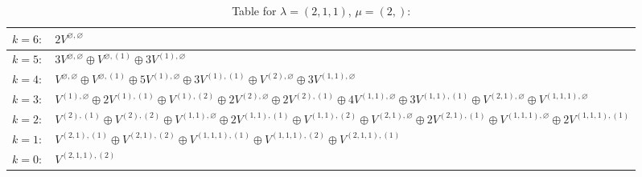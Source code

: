 \documentclass[a4paper,12pt]{article}
\begin{document}
\renewcommand{\arraystretch}{1.6} 
\begin{table}[H]
\centering
\caption{Table for $\lambda = (2, 1, 1)$, $\mu = (2,)$:}
\begin{tabular}{|>{\centering\arraybackslash}p{15cm}|}
\hline
 $k = 6: \quad 2 V^{\varnothing, \varnothing} $ \\ \hline
 $k = 5: \quad 3 V^{\varnothing, \varnothing} \oplus V^{\varnothing, (1)} \oplus 3 V^{(1), \varnothing} $ \\ \hline
 $k = 4: \quad V^{\varnothing, \varnothing} \oplus V^{\varnothing, (1)} \oplus 5 V^{(1), \varnothing} \oplus 3 V^{(1), (1)} \oplus V^{(2), \varnothing} \oplus 3 V^{(1, 1), \varnothing} $ \\ \hline
 $k = 3: \quad V^{(1), \varnothing} \oplus 2 V^{(1), (1)} \oplus V^{(1), (2)} \oplus 2 V^{(2), \varnothing} \oplus 2 V^{(2), (1)} \oplus 4 V^{(1, 1), \varnothing} \oplus 3 V^{(1, 1), (1)} \oplus V^{(2, 1), \varnothing} \oplus V^{(1, 1, 1), \varnothing} $ \\ \hline
 $k = 2: \quad V^{(2), (1)} \oplus V^{(2), (2)} \oplus V^{(1, 1), \varnothing} \oplus 2 V^{(1, 1), (1)} \oplus V^{(1, 1), (2)} \oplus V^{(2, 1), \varnothing} \oplus 2 V^{(2, 1), (1)} \oplus V^{(1, 1, 1), \varnothing} \oplus 2 V^{(1, 1, 1), (1)} $ \\ \hline
 $k = 1: \quad V^{(2, 1), (1)} \oplus V^{(2, 1), (2)} \oplus V^{(1, 1, 1), (1)} \oplus V^{(1, 1, 1), (2)} \oplus V^{(2, 1, 1), (1)} $ \\ \hline
 $k = 0: \quad V^{(2, 1, 1), (2)} $ \\ \hline
\end{tabular}
\end{table}
\end{document}
